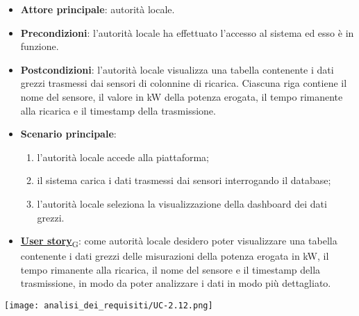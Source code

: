 \begin{itemize}
	\item \textbf{Attore principale}: autorità locale.
	\item \textbf{Precondizioni}: l'autorità locale ha effettuato l'accesso al sistema ed esso è in funzione.
	\item \textbf{Postcondizioni}: l'autorità locale visualizza una tabella contenente i dati grezzi trasmessi dai sensori di colonnine di ricarica.
	      Ciascuna riga contiene il nome del sensore, il valore in kW della potenza erogata, il tempo rimanente alla ricarica e il timestamp della trasmissione.
	\item \textbf{Scenario principale}:
	      \begin{enumerate}
		      \item l'autorità locale accede alla piattaforma;
		      \item il sistema carica i dati trasmessi dai sensori interrogando il database;
		      \item l'autorità locale seleziona la visualizzazione della dashboard dei dati grezzi.
	      \end{enumerate}
	\item \href{https://7last.github.io/docs/pb/documentazione-interna/glossario\#user-story}{\textbf{User story}\textsubscript{G}}:
	      come autorità locale desidero poter visualizzare una tabella contenente i dati grezzi delle misurazioni della potenza erogata in kW,
	      il tempo rimanente alla ricarica, il nome del sensore e il timestamp della trasmissione, in modo da poter analizzare i dati in modo più dettagliato.
\end{itemize}
\begin{center}
	\texttt{[image: analisi\_dei\_requisiti/UC-2.12.png]}
\end{center}


